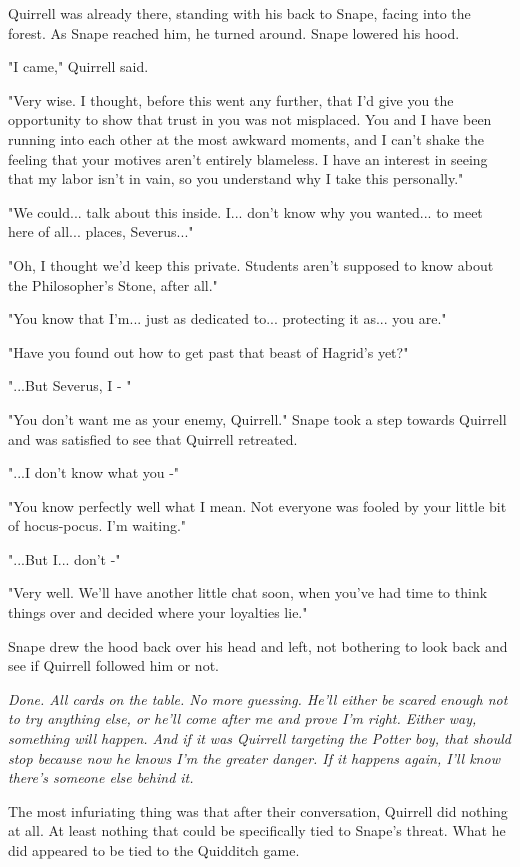 Quirrell was already there, standing with his back to Snape, facing into the forest. As Snape reached him, he turned around. Snape lowered his hood.

"I came," Quirrell said.

"Very wise. I thought, before this went any further, that I'd give you the opportunity to show that trust in you was not misplaced. You and I have been running into each other at the most awkward moments, and I can't shake the feeling that your motives aren't entirely blameless. I have an interest in seeing that my labor isn't in vain, so you understand why I take this personally."

"We could... talk about this inside. I... don't know why you wanted... to meet here of all... places, Severus..."

"Oh, I thought we'd keep this private. Students aren't supposed to know about the Philosopher's Stone, after all."

"You know that I'm... just as dedicated to... protecting it as... you are."

"Have you found out how to get past that beast of Hagrid's yet?"

"...But Severus, I - "

"You don't want me as your enemy, Quirrell." Snape took a step towards Quirrell and was satisfied to see that Quirrell retreated.

"...I don't know what you -"

"You know perfectly well what I mean. Not everyone was fooled by your little bit of hocus-pocus. I'm waiting."

"...But I... don't -"

"Very well. We'll have another little chat soon, when you've had time to think things over and decided where your loyalties lie."

Snape drew the hood back over his head and left, not bothering to look back and see if Quirrell followed him or not.

\emph{Done. All cards on the table. No more guessing. He'll either be scared enough not to try anything else, or he'll come after me and prove I'm right. Either way, something will happen. And if it was Quirrell targeting the Potter boy, that should stop because now he knows I'm the greater danger. If it happens again, I'll know there's someone else behind it.}

The most infuriating thing was that after their conversation, Quirrell did nothing at all. At least nothing that could be specifically tied to Snape's threat. What he did appeared to be tied to the Quidditch game.

